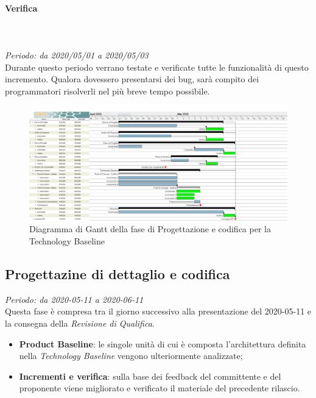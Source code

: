 \paragraph*{Verifica}\mbox{} \\ \mbox{} \\ 
\textit{Periodo: da 2020/05/01 a 2020/05/03}\\
Durante questo periodo verrano testate e verificate tutte le funzionalità di questo incremento. Qualora dovessero presentarsi dei bug, sarà compito dei programmatori risolverli nel più breve tempo possibile.

\begin{figure}[H]
\centering
\includegraphics[scale=0.24]{./img/gantt/progettazione_architetturale.png}
\caption{Diagramma di Gantt della fase di Progettazione e codifica per la Technology Baseline}
\end{figure}

\subsection{Progettazine di dettaglio e codifica}
\textit{Periodo: da 2020-05-11 a 2020-06-11}\\
Questa fase è compresa tra il giorno successivo alla presentazione del 2020-05-11 e la consegna della \textit{Revisione di Qualifica}.
\begin{itemize}
\item \textbf{Product Baseline}: le singole unità di cui è composta l'architettura definita nella \textit{Technology Baseline} vengono ulteriormente analizzate;
\item \textbf{Incrementi e verifica}: sulla base dei feedback del committente e del proponente viene migliorato e verificato il materiale del precedente rilascio.
\end{itemize}

